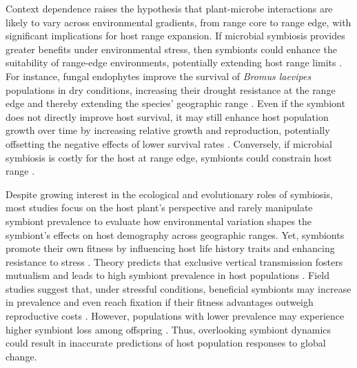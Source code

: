 \documentclass[12pt]{article}\usepackage[]{graphicx}\usepackage[dvipsnames]{xcolor}
\begin{document}
Context dependence raises the hypothesis that plant-microbe interactions are likely to vary across environmental gradients, from range core to range edge, with significant implications for host range expansion. If microbial symbiosis provides greater benefits under environmental stress, then symbionts could enhance the suitability of range-edge environments, potentially extending host range limits \citep{allsup2023shifting,rudgers2020climate}.
For instance, fungal endophytes improve the survival of \emph{Bromus laevipes}  populations in dry conditions, increasing their drought resistance at the range edge and thereby extending the species' geographic range \citep{david2019soil,afkhami2014mutualist}.
Even if the symbiont does not directly improve host survival, it may still enhance host population growth over time by increasing relative growth and reproduction, potentially offsetting the negative effects of lower survival rates \citep{yule2013costs}.
Conversely, if microbial symbiosis is costly for the host at range edge, symbionts could constrain host range \citep{benning2021microbes,benning2021plant,bennett2022costs}.

Despite growing interest in the ecological and evolutionary roles of symbiosis, most studies focus on the host plant’s perspective and rarely manipulate symbiont prevalence to evaluate how environmental variation shapes the symbiont’s effects on host demography across geographic ranges. 
Yet, symbionts promote their own fitness by influencing host life history traits and enhancing resistance to stress \citep{kazenel2015mutualistic, giauque2019endophyte, saikkonen1998fungal}. 
Theory predicts that exclusive vertical transmission fosters mutualism and leads to high symbiont prevalence in host populations \citep{fine1975vectors}. 
Field studies suggest that, under stressful conditions, beneficial symbionts may increase in prevalence and even reach fixation if their fitness advantages outweigh reproductive costs \citep{donald2021context}. 
However, populations with lower prevalence may experience higher symbiont loss among offspring \citep{afkhami2008symbiosis}. 
Thus, overlooking symbiont dynamics could result in inaccurate predictions of host population responses to global change.
\end{document}
